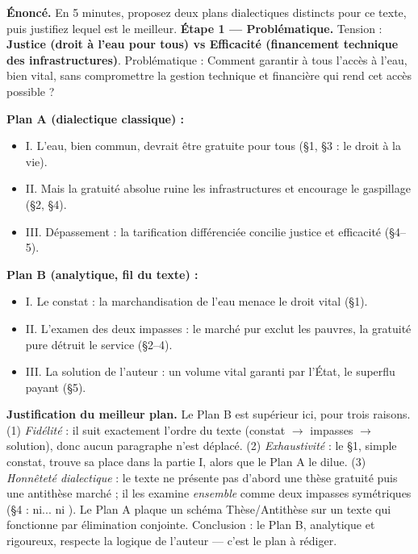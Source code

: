 \documentclass[11pt]{article}
\begin{document}
\begin{exoresolu}
\textbf{Énoncé.} En 5 minutes, proposez deux plans dialectiques distincts pour ce texte, puis justifiez lequel est le meilleur.
\tcblower
\textbf{Étape 1 — Problématique.} Tension : \textbf{Justice (droit à l'eau pour tous) vs Efficacité (financement technique des infrastructures)}. Problématique : \og Comment garantir à tous l'accès à l'eau, bien vital, sans compromettre la gestion technique et financière qui rend cet accès possible ? \fg{}\par\medskip
\textbf{Plan A (dialectique classique) :}
\begin{itemize}
\item I. L'eau, bien commun, devrait être gratuite pour tous (\S 1, \S 3 : le droit à la vie).
\item II. Mais la gratuité absolue ruine les infrastructures et encourage le gaspillage (\S 2, \S 4).
\item III. Dépassement : la tarification différenciée concilie justice et efficacité (\S 4--5).
\end{itemize}
\textbf{Plan B (analytique, fil du texte) :}
\begin{itemize}
\item I. Le constat : la marchandisation de l'eau menace le droit vital (\S 1).
\item II. L'examen des deux impasses : le marché pur exclut les pauvres, la gratuité pure détruit le service (\S 2--4).
\item III. La solution de l'auteur : un volume vital garanti par l'État, le superflu payant (\S 5).
\end{itemize}
\textbf{Justification du meilleur plan.} Le Plan B est supérieur ici, pour trois raisons. (1) \emph{Fidélité} : il suit exactement l'ordre du texte (constat $\rightarrow$ impasses $\rightarrow$ solution), donc aucun paragraphe n'est déplacé. (2) \emph{Exhaustivité} : le \S 1, simple constat, trouve sa place dans la partie I, alors que le Plan A le dilue. (3) \emph{Honnêteté dialectique} : le texte ne présente pas d'abord une thèse \og gratuité \fg{} puis une antithèse \og marché \fg{} ; il les examine \emph{ensemble} comme deux impasses symétriques (\S 4 : \og ni... ni \fg). Le Plan A plaque un schéma Thèse/Antithèse sur un texte qui fonctionne par élimination conjointe. Conclusion : le Plan B, analytique et rigoureux, respecte la logique de l'auteur — c'est le plan à rédiger.
\end{exoresolu}
\end{document}
